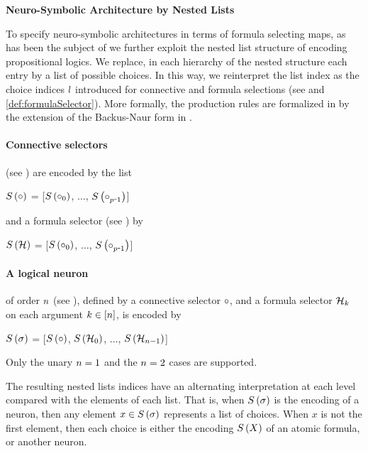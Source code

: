 \textbf{Neuro-Symbolic Architecture by Nested Lists}

To specify neuro-symbolic architectures in terms of formula selecting maps, as has been the subject of  we further exploit the nested list structure of encoding propositional logics.
We replace, in each hierarchy of the nested structure each entry by a list of possible choices.
In this way, we reinterpret the list index as the choice indices $l$ introduced for connective and formula selections (see  and \ref{def:formulaSelector}).
More formally, the production rules are formalized in  by the extension of the Backus-Naur form in .

\paragraph{Connective selectors} (see ) are encoded by the list
\begin{centeredcode}
    $S\left(\circ\right)$
			= [$S\left(\circ_{0}\right)$, $\ldots$, $\synencodingof{\exconnective_{\seldim\shortminus1}}$]
\end{centeredcode}
and a formula selector (see ) by
\begin{centeredcode}
    $S\left(\mathcal{H}\right)$
			= [$S\left(\circ_{0}\right)$, $\ldots$, $\synencodingof{\exconnective_{\seldim\shortminus1}}$]
\end{centeredcode}

\paragraph{A logical neuron} of order $n$ (see ), defined by a connective selector $\circ$, and a formula selector $\mathcal{H}_k$ on each argument $k\in[n]$, is encoded by
\begin{centeredcode}
    $S\left(\sigma\right)$
			= [$S\left(\circ\right)$, $S\left(\mathcal{H}_0\right)$, $\ldots$,  $S\left(\mathcal{H}_{n-1}\right)$]
\end{centeredcode}
Only the unary $n=1$ and the $n=2$ cases are supported.


The resulting nested lists indices have an alternating interpretation at each level compared with the elements of each list.
That is, when $S\left(\sigma\right)$ is the encoding of a neuron, then any element $x\in S\left(\sigma\right)$ represents a list of choices.
When $x$ is not the first element, then each choice is either the encoding $S\left(X\right)$ of an atomic formula, or another neuron.

